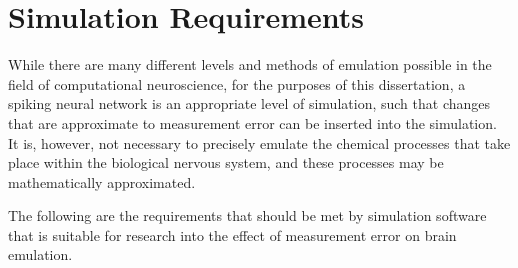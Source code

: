 \section{Simulation Requirements}


While there are many different levels and methods of emulation possible in the
field of computational neuroscience, for the purposes of this dissertation, a
spiking neural network is an appropriate level of simulation, such that changes
that are approximate to measurement error can be inserted into the simulation.
It is, however, not necessary to precisely emulate the chemical processes that
take place within the biological nervous system, and these processes may be
mathematically approximated. 

The following are the requirements that should be met by simulation software
that is suitable for research into the effect of measurement error on brain
emulation.

